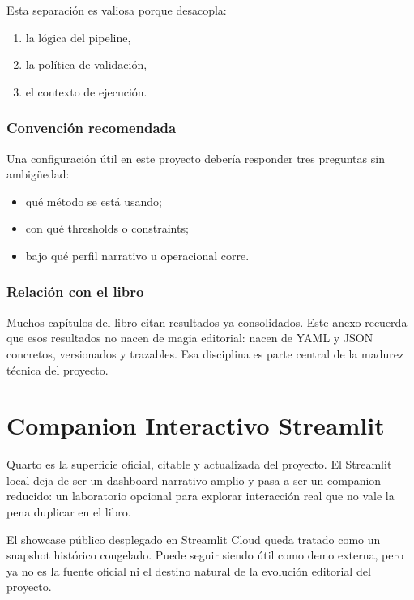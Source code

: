 \documentclass[
  spanish,
  11pt,
  letterpaper,
]{scrbook}
\providecommand{\tightlist}{%
  \setlength{\itemsep}{0pt}\setlength{\parskip}{0pt}}
\theoremstyle{plain}
\theoremstyle{remark}
\begin{document}
Esta separación es valiosa porque desacopla:

\begin{enumerate}
\def\labelenumi{\arabic{enumi}.}
\tightlist
\item
  la lógica del pipeline,
\item
  la política de validación,
\item
  el contexto de ejecución.
\end{enumerate}

\subsection{Convención recomendada}\label{convenciuxf3n-recomendada}

Una configuración útil en este proyecto debería responder tres preguntas
sin ambigüedad:

\begin{itemize}
\tightlist
\item
  qué método se está usando;
\item
  con qué thresholds o constraints;
\item
  bajo qué perfil narrativo u operacional corre.
\end{itemize}

\subsection{Relación con el libro}\label{relaciuxf3n-con-el-libro}

Muchos capítulos del libro citan resultados ya consolidados. Este anexo
recuerda que esos resultados no nacen de magia editorial: nacen de YAML
y JSON concretos, versionados y trazables. Esa disciplina es parte
central de la madurez técnica del proyecto.

\chapter{Companion Interactivo
Streamlit}\label{companion-interactivo-streamlit}

Quarto es la superficie oficial, citable y actualizada del proyecto. El
Streamlit local deja de ser un dashboard narrativo amplio y pasa a ser
un companion reducido: un laboratorio opcional para explorar interacción
real que no vale la pena duplicar en el libro.

El showcase público desplegado en Streamlit Cloud queda tratado como un
snapshot histórico congelado. Puede seguir siendo útil como demo
externa, pero ya no es la fuente oficial ni el destino natural de la
evolución editorial del proyecto.
\end{document}
